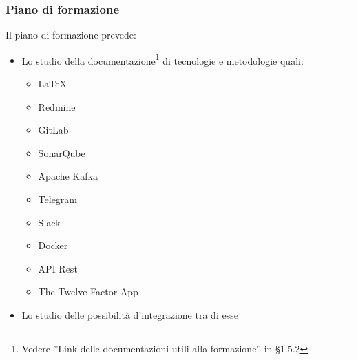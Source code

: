 		\subsubsection{Piano di formazione}
		Il piano di formazione prevede:
		\begin{itemize}
			\item Lo studio della documentazione\footnote{Vedere ''Link delle documentazioni utili alla formazione'' in \S{1.5.2}} di tecnologie e metodologie quali:
			\begin{itemize}
				\item \LaTeX 
				\item Redmine 
				\item GitLab 
				\item SonarQube
				\item Apache Kafka
				\item Telegram 
				\item Slack 
				\item Docker 
				\item API Rest
				\item The Twelve-Factor App
			\end{itemize}
			\item Lo studio delle possibilità d'integrazione tra di esse
		\end{itemize}
